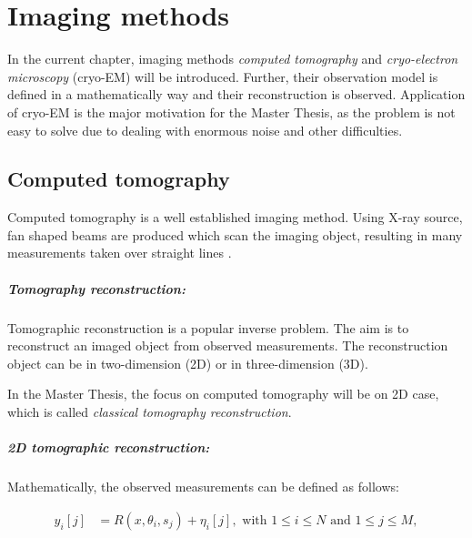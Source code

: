 \chapter{Imaging methods}
\label{sec:imaging}

In the current chapter, imaging methods \textit{computed tomography} and 
\textit{cryo-electron microscopy} (cryo-EM) will be introduced. 
Further, their observation model is defined in a mathematically way and their reconstruction is observed.
Application of cryo-EM is the major motivation for the Master Thesis, 
as the problem is not easy to solve due to dealing with enormous noise and other difficulties.


\section{Computed tomography}
Computed tomography is a well established imaging method.
Using X-ray source, fan shaped beams are produced which scan the imaging object,
resulting in many measurements taken over straight lines \cite{computedTomography}.

\paragraph{Tomography reconstruction:}
Tomographic reconstruction\cite{tomographicReconstruction} is a popular inverse problem. 
The aim is to reconstruct an imaged object from observed measurements.
The reconstruction object can be in two-dimension (2D) or in three-dimension (3D). 

\begin{tcolorbox}[colback=red!5!white,colframe=red!75!black]
    In the Master Thesis, the focus on computed tomography will be on 2D case, which is called \textit{classical tomography reconstruction}.
\end{tcolorbox}

\paragraph{2D tomographic reconstruction:}

Mathematically, the observed measurements can be defined as follows:

\begin{equation}
    \label{eq:2Dreconstruction}
    \begin{aligned}
        y_i[j] &= R(x, \theta_i, s_j) + \eta_i[j] , \text{ with } 1 \leq i \leq N \text{ and } 1 \leq j \leq M,
    \end{aligned}
\end{equation}

